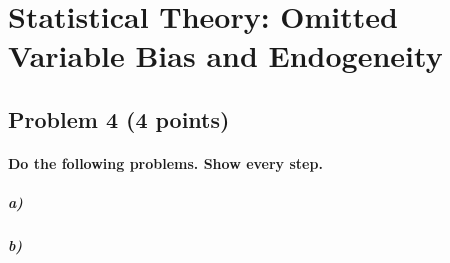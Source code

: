 \documentclass[12pt]{article}
\begin{document}
\section*{Statistical Theory: Omitted Variable Bias and Endogeneity}

\subsection*{Problem 4 (4 points)}

\paragraph{Do the following problems. Show every step.}

\subparagraph{a)}

\subparagraph{b)}
\end{document}
